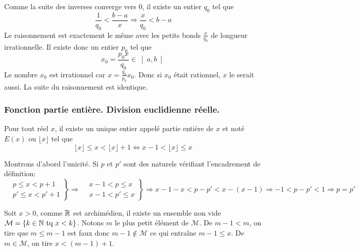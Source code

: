 \begin{demo}
Comme la suite des inverses converge vers $0$, il existe un entier $q_0$ tel que
\begin{displaymath}
 \frac{1}{q_0} < \frac{b-a}{x} \Rightarrow \frac{x}{q_0}<b-a
\end{displaymath}
Le raisonnement est exactement le même avec les petits bonds $\frac{x}{q_0}$ de longueur irrationnelle. Il existe donc un entier $p_0$ tel que
\begin{displaymath}
 x_0 = \frac{p_0x}{q_0} \in \left] a,b \right[
\end{displaymath}
Le nombre $x_0$ est irrationnel car $x=\frac{q_0}{p_0}x_0$. Donc si $x_0$ était rationnel, $x$ le serait aussi. La suite du raisonnement est identique.
\end{demo}

\subsubsection{Fonction partie entière. Division euclidienne réelle. }
 
\begin{propdef}
 Pour tout réel $x$, il existe un unique entier appelé partie entière de $x$ et noté $E(x)$ ou $\lfloor x \rfloor$ tel que
\begin{displaymath}
 \lfloor x \rfloor \leq x < \lfloor x \rfloor +1 \Leftrightarrow x - 1 <\lfloor x \rfloor \leq x
\end{displaymath}
\end{propdef}
\begin{demo}
Montrons d'abord l'unicité. Si $p$ et $p'$ sont des naturels vérifiant l'encadrement de définition:
\begin{displaymath}
\left. 
\begin{aligned}
  &p\leq x < p+1 \\ & p'\leq x < p'+1 
\end{aligned}
\right\rbrace \Rightarrow
\left. 
\begin{aligned}
  &x-1 < p \leq x \\ &x-1 < p' \leq x 
\end{aligned}
\right\rbrace \Rightarrow
x-1 -x < p - p' < x -(x-1) \Rightarrow -1 < p-p' < 1 \Rightarrow p=p'
\end{displaymath}

Soit  $x >0$,  comme $\mathbb{R}$ est archimédien, il existe un ensemble non vide $\mathcal{M}=\left\lbrace k\in \mathbb{N} \text{ tq } x < k \right\rbrace$. Notons $m$ le plus petit élément de $\mathcal{M}$.\newline
De $m-1 < m$, on tire que $m\leq m-1$ est faux donc $m-1\notin \mathcal{M}$ ce qui entraîne $m-1\leq x$. De $m\in \mathcal{M}$, on tire $x<(m-1)+1$. 
\end{demo}
